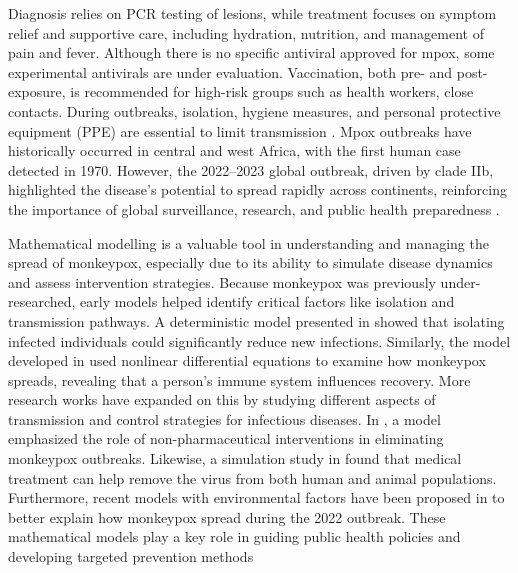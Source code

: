 \documentclass[10pt]{NSP1}
\begin{document}
Diagnosis relies on PCR testing of lesions, while treatment focuses on symptom relief and supportive care, including hydration, nutrition, and management of pain and fever. Although there is no specific antiviral approved for mpox, some experimental antivirals are under evaluation. Vaccination, both pre- and post-exposure, is recommended for high-risk groups such as health workers, close contacts. During outbreaks, isolation, hygiene measures, and personal protective equipment (PPE) are essential to limit transmission \cite{ref4,ref5}. Mpox outbreaks have historically occurred in central and west Africa, with the first human case detected in 1970. However, the 2022--2023 global outbreak, driven by clade IIb, highlighted the disease's potential to spread rapidly across continents, reinforcing the importance of global surveillance, research, and public health preparedness \cite{ref6,ref7}.

Mathematical modelling is a valuable tool in understanding and managing the spread of monkeypox, especially due to its ability to simulate disease dynamics and assess intervention strategies. Because monkeypox was previously under-researched, early models helped identify critical factors like isolation and transmission pathways. A deterministic model presented in \cite{ref8} showed that isolating infected individuals could significantly reduce new infections. Similarly, the model developed in \cite{ref9} used nonlinear differential equations to examine how monkeypox spreads, revealing that a person's immune system influences recovery. More research works \cite{ref10,ref11,ref12,ref13} have expanded on this by studying different aspects of transmission and control strategies for infectious diseases. In \cite{ref14}, a model emphasized the role of non-pharmaceutical interventions in eliminating monkeypox outbreaks. Likewise, a simulation study in \cite{ref15} found that medical treatment can help remove the virus from both human and animal populations. Furthermore, recent models with environmental factors have been proposed in \cite{ref16,ref17} to better explain how monkeypox spread during the 2022 outbreak. These mathematical models play a key role in guiding public health policies and developing targeted prevention methods
\end{document}
